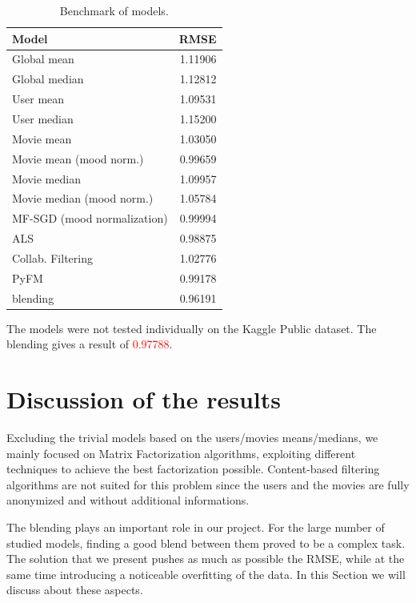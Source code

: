 \documentclass[10pt,conference,compsocconf]{IEEEtran}
\begin{document}
\begin{table}[htbp]
\centering
\begin{tabular}[c]{| l r |}
\hline
Model & RMSE \\
\hline 
\hline
Global mean			& 1.11906 \\
Global median			& 1.12812 \\
User mean			& 1.09531 \\
User median			& 1.15200 \\
Movie mean			& 1.03050 \\
Movie mean (mood norm.)		& 0.99659 \\
Movie median			& 1.09957 \\
Movie median (mood norm.)	& 1.05784 \\
MF-SGD (mood normalization)	& 0.99994 \\
ALS				& 0.98875 \\
Collab. Filtering		& 1.02776 \\
PyFM				& 0.99178 \\ \hline\hline
blending			& 0.96191 \\ 
\hline
\end{tabular}
  \caption{Benchmark of models.}
  \label{benchmark}
\end{table}

The models were not tested individually on the Kaggle Public dataset. The blending gives a result of \textcolor{red}{0.97788}. 

\section{Discussion of the results}

Excluding the trivial models based on the users/movies means/medians, we mainly focused on Matrix
Factorization algorithms, exploiting different techniques to achieve the best factorization
possible. Content-based filtering algorithms are not suited for this problem since the users and the
movies are fully anonymized and without additional informations.

The blending plays an important role in our project. For the large number of studied models,
finding a good blend between them proved to be a complex task. The solution that we present pushes
as much as possible the RMSE, while at the same time introducing a noticeable overfitting of the
data.
In this Section we will discuss about these aspects.

\end{document}
